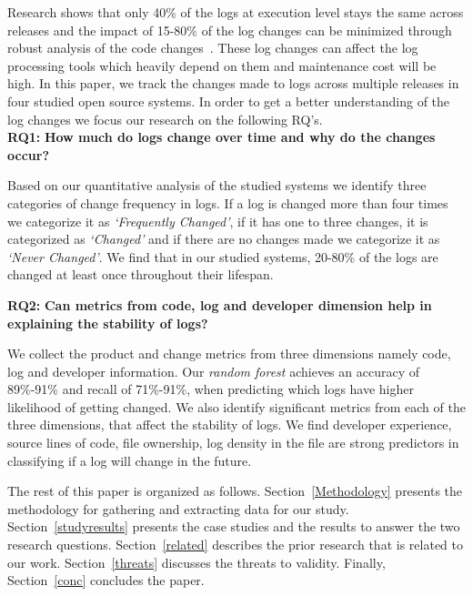 Research shows that only 40\% of the logs at execution level stays the same across releases and the impact of 15-80\% of the log changes can be minimized through robust analysis of the code changes~\cite{IanWCRE}. These log changes can affect the log processing tools which heavily depend on them and maintenance cost will be high. In this paper, we track the changes made to logs across multiple releases in four studied open source systems. In order to get a better understanding of the log changes we focus our research on the following RQ's.\\


\textbf{RQ1:} \textbf{How much do logs change over time and why do the changes occur?}

Based on our quantitative analysis of the studied systems we identify three categories of change frequency in logs. If a log is changed more than four times we categorize it as \textsl{`Frequently Changed'}, if it has one to three changes, it is categorized as \textsl{`Changed'} and if there are no changes made we categorize it as \textsl{`Never Changed'}. We find that in our studied systems, 20-80\% of the logs are changed at least once throughout their lifespan.


\textbf{RQ2:} \textbf{Can metrics from code, log and developer dimension help in explaining the stability of logs?}

We collect the product and change metrics from three dimensions namely code, log and developer information. Our \textsl{random forest} achieves an accuracy of 89\%-91\% and recall of 71\%-91\%, when predicting which logs have higher likelihood of getting changed. We also identify significant metrics from each of the three dimensions, that affect the stability of logs. We find  developer experience, source lines of code, file ownership, log density in the file are strong predictors in classifying if a log will change in the future. 
 
 
 
The rest of this paper is organized as follows. Section~\ref{Methodology} presents the methodology for gathering and extracting data for our study. Section~\ref{studyresults} presents the case studies and the results to answer the two research questions. Section~\ref{related} describes the prior research that is related to our work. Section~\ref{threats} discusses the threats to validity. Finally, Section~\ref{conc} concludes the paper.
 
 
